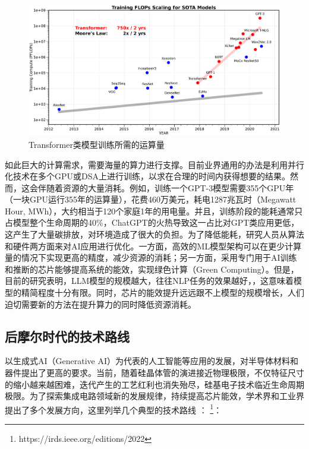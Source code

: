 \begin{figure}[htb]
    \centering
    \includegraphics[width=\textwidth]{figs/AI-Fig-ai_and_compute.pdf}
    \caption{Transformer类模型训练所需的运算量}
    \label{AI:ai_and_compute}
\end{figure}


如此巨大的计算需求，需要海量的算力进行支撑。目前业界通用的办法是利用并行化技术在多个GPU或DSA上进行训练，以求在合理的时间内获得想要的结果。然而，这会伴随着资源的大量消耗。例如，训练一个GPT-3模型需要355个GPU年（一块GPU运行355年的运算量），花费460万美元，耗电1287兆瓦时（Megawatt Hour, MWh），大约相当于120个家庭1年的用电量\cite{AI:carbon_google_2021,AI:zeus}。并且，训练阶段的能耗通常只占模型整个生命周期的40\%\cite{AI:carbon_google_2022}，ChatGPT的火热导致这一占比对GPT类应用更低，这产生了大量碳排放，对环境造成了很大的负担。为了降低能耗，研究人员从算法和硬件两方面来对AI应用进行优化。一方面，高效的ML模型架构可以在更少计算量的情况下实现更高的精度，减少资源的消耗；另一方面，采用专门用于AI训练和推断的芯片能够提高系统的能效，实现绿色计算（Green Computing）\cite{AI:green_computing}。但是，目前的研究表明，LLM模型的规模越大，往往NLP任务的效果越好，\cite{AI:llm_overview}，这意味着模型的精简程度十分有限。同时，芯片的能效提升远远跟不上模型的规模增长，人们迫切需要新的方法在提升算力的同时降低资源消耗。


\subsection{后摩尔时代的技术路线}

以生成式AI（Generative AI）为代表的人工智能等应用的发展，对半导体材料和器件提出了更高的要求。当前，随着硅晶体管的演进接近物理极限，不仅特征尺寸的缩小越来越困难，迭代产生的工艺红利也消失殆尽，硅基电子技术临近生命周期极限。为了探索集成电路领域新的发展规律，持续提高芯片能效，学术界和工业界提出了多个发展方向，这里列举几个典型的技术路线
\ifdefined\Blind
：
\else
\footnote{https://irds.ieee.org/editions/2022}：
\fi

